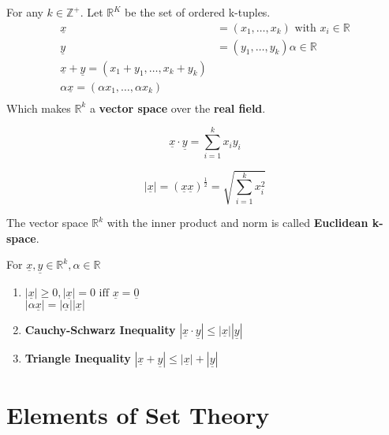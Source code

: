 \documentclass[11pt,fleqn]{book} %
\begin{document}
\begin{definition}
	For any $k \in \mathbb{Z}^+$. Let $\mathbb{R}^K$ be the set of ordered k-tuples. 
	\begin{align*}
	\underline{x} &= (x_1, \dots, x_k) \text{ with }x_i \in \mathbb{R}\\
	\underline{y} &= (y_1, \dots, y_k) \alpha \in \mathbb{R}\\
	\underline{x} + \underline{y} = (x_1 + y_1, \dots, x_k + y_k)\\
	\alpha\underline{x}= (\alpha x_1, \dots, \alpha x_k)\\
	\end{align*}
	Which makes $\mathbb{R}^k$ a \textbf{vector space} over the \textbf{real field}.
\end{definition}

\begin{definition}
$$ \underline{x} \cdot \underline{y} = \sum\limits_{i=1}^k x_i y_i$$	
\end{definition}

\begin{definition}
	$$|\underline{x}| = (\underline{x}\underline{x})^{\frac{1}{2}} = \sqrt{\sum\limits_{i=1}^k x_i^2} $$
\end{definition}

\begin{definition}
	The vector space $\mathbb{R}^k$ with the inner product and norm is called \textbf{Euclidean k-space}.
\end{definition}

\begin{theorem}
	For $\underline{x}, \underline{y} \in \mathbb{R}^k, \alpha \in \mathbb{R}$
	\begin{enumerate}[label = \alph*)]
		\item $|\underline{x}| \ge 0, |\underline{x}| = 0 \text{ iff } \underline{x} = \underline{0}$\\
		$|\alpha \underline{x}| = |\underline{\alpha}||\underline{x}|$ 
		\item \textbf{Cauchy-Schwarz Inequality} $|\underline{x}\cdot\underline{y}| \le |\underline{x}||\underline{y}|$
		\item \textbf{Triangle Inequality} $|\underline{x}+\underline{y}| \le |\underline{x}| + |\underline{y}|$
	\end{enumerate}
\end{theorem}

\section{Elements of Set Theory}
\end{document}
